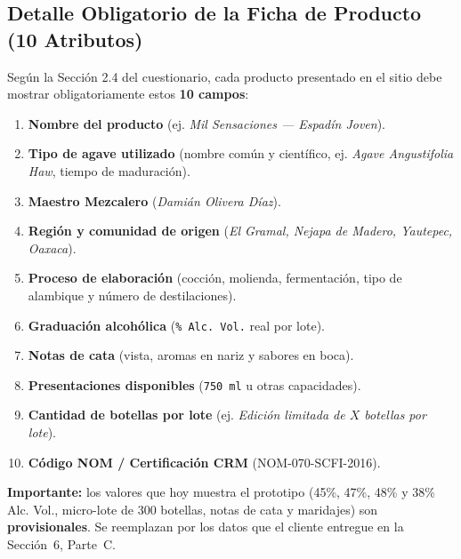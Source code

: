 \documentclass[11pt,letterpaper]{article}
\begin{document}
\subsection{Detalle Obligatorio de la Ficha de Producto (10 Atributos)}
Según la Sección 2.4 del cuestionario, cada producto presentado en el sitio debe mostrar obligatoriamente estos \textbf{10 campos}:
\begin{enumerate}[leftmargin=1.8em]
    \item \textbf{Nombre del producto} (ej. \textit{Mil Sensaciones — Espadín Joven}).
    \item \textbf{Tipo de agave utilizado} (nombre común y científico, ej. \textit{Agave Angustifolia Haw}, tiempo de maduración).
    \item \textbf{Maestro Mezcalero} (\textit{Damián Olivera Díaz}).
    \item \textbf{Región y comunidad de origen} (\textit{El Gramal, Nejapa de Madero, Yautepec, Oaxaca}).
    \item \textbf{Proceso de elaboración} (cocción, molienda, fermentación, tipo de alambique y número de destilaciones).
    \item \textbf{Graduación alcohólica} (\texttt{\% Alc. Vol.} real por lote).
    \item \textbf{Notas de cata} (vista, aromas en nariz y sabores en boca).
    \item \textbf{Presentaciones disponibles} (\texttt{750 ml} u otras capacidades).
    \item \textbf{Cantidad de botellas por lote} (ej. \textit{Edición limitada de $X$ botellas por lote}).
    \item \textbf{Código NOM / Certificación CRM} (NOM-070-SCFI-2016).
\end{enumerate}

\textbf{Importante:} los valores que hoy muestra el prototipo (45\%, 47\%, 48\% y 38\% Alc. Vol., micro-lote de 300 botellas, notas de cata y maridajes) son \textbf{provisionales}. Se reemplazan por los datos que el cliente entregue en la Sección~6, Parte~C.

\end{document}
